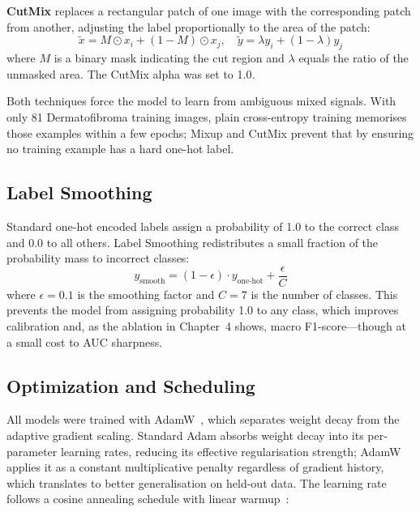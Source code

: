 \textbf{CutMix} replaces a rectangular patch of one image with the corresponding patch from another, adjusting the label proportionally to the area of the patch:
\begin{equation}
\tilde{x} = M \odot x_i + (1 - M) \odot x_j, \quad \tilde{y} = \lambda y_i + (1 - \lambda) y_j
\label{eq:cutmix}
\end{equation}
where $M$ is a binary mask indicating the cut region and $\lambda$ equals the ratio of the unmasked area. The CutMix alpha was set to 1.0.

Both techniques force the model to learn from ambiguous mixed signals. With only 81 Dermatofibroma training images, plain cross-entropy training memorises those examples within a few epochs; Mixup and CutMix prevent that by ensuring no training example has a hard one-hot label.

\subsection{Label Smoothing}

Standard one-hot encoded labels assign a probability of 1.0 to the correct class and 0.0 to all others. Label Smoothing redistributes a small fraction of the probability mass to incorrect classes:
\begin{equation}
y_{\text{smooth}} = (1 - \epsilon) \cdot y_{\text{one-hot}} + \frac{\epsilon}{C}
\label{eq:label_smooth}
\end{equation}
where $\epsilon = 0.1$ is the smoothing factor and $C = 7$ is the number of classes. This prevents the model from assigning probability 1.0 to any class, which improves calibration and, as the ablation in Chapter~4 shows, macro F1-score---though at a small cost to AUC sharpness.

\subsection{Optimization and Scheduling}

All models were trained with AdamW~\cite{loshchilov2019decoupled}, which separates weight decay from the adaptive gradient scaling. Standard Adam absorbs weight decay into its per-parameter learning rates, reducing its effective regularisation strength; AdamW applies it as a constant multiplicative penalty regardless of gradient history, which translates to better generalisation on held-out data. The learning rate follows a cosine annealing schedule with linear warmup~\cite{loshchilov2017sgdr}:

